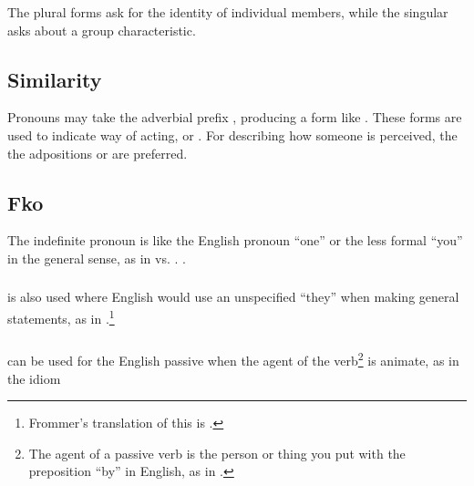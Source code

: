 \noindent The plural forms ask for the identity of individual members,
while the singular asks about a group characteristic.

\subsection{Similarity} Pronouns may take the adverbial prefix
, producing a form like  . These forms
are used to indicate way of acting,   or . For describing how someone is
perceived, the the adpositions  or  are preferred. 

\subsection{Fko} The indefinite pronoun  is like the English
pronoun ``one'' or the less formal ``you'' in the general sense, as in
 vs. .  
 .

\subsubsection{}  is also used where English would use an
unspecified ``they'' when making general statements, as in
.\footnote{Frommer's
translation of this is .}

\subsubsection{}  can be used for the English passive when the
agent of the verb\footnote{The agent of a passive verb is the person
or thing you put with the preposition ``by'' in English, as in .} is animate, as in the idiom    
\label{syn:prn:fko}

